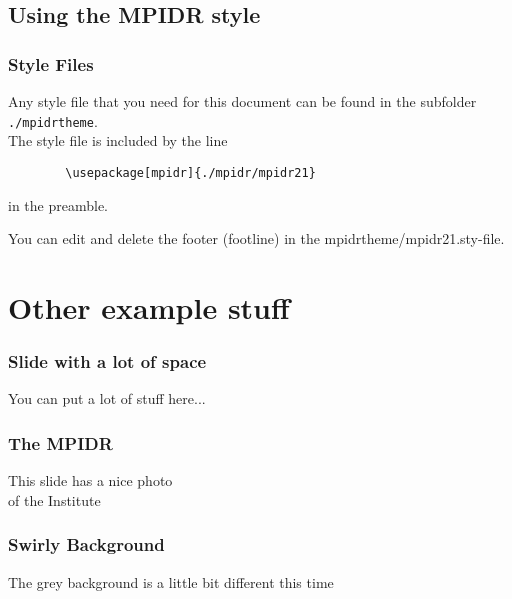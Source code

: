 \documentclass[aspectratio=169]{beamer}
\begin{document}
\subsection{Using the MPIDR style}
\begin{frame}[mpidrbackground=2, fragile]%
    \frametitle{Style Files}
  Any style file that you need for this document can be found in the subfolder \texttt{./mpidrtheme}.\\
  
  The style file is included by the line
	\begin{verbatim}
		\usepackage[mpidr]{./mpidr/mpidr21}
	\end{verbatim}
	in the preamble.
	
	You can edit and delete the footer (footline) in the mpidrtheme/mpidr21.sty-file.
	
\end{frame}


\section{Other example stuff}



\begin{frame}[mpidrbackground=4]
    \frametitle{Slide with a lot of space}
 You can put a lot of stuff here...
\end{frame}

\begin{frame}[mpidrbackground=3]
    \frametitle{The MPIDR}
  This slide has a nice photo \\ of the Institute
\end{frame}
\begin{frame}[mpidrbackground=5]
    \frametitle{Swirly Background}
  The grey background is a little bit different this time
\end{frame}




\end{document}

